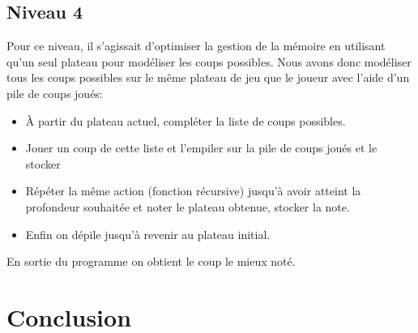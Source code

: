 \documentclass[a4paper, 11pt]{article}
\begin{document}
\subsection{Niveau 4}
Pour ce niveau, il s'agissait d'optimiser la gestion de la mémoire en utilisant qu'un seul plateau pour modéliser les coups possibles. Nous avons donc modéliser tous les coups possibles sur le même plateau de jeu que le joueur avec l'aide d'un pile de coups joués:
\begin{itemize}
\item À partir du plateau actuel, compléter la liste de coups possibles.
\item Jouer un coup de cette liste et l'empiler sur la pile de coups joués et le stocker
\item Répéter la même action (fonction récursive) jusqu'à avoir atteint la profondeur souhaitée et noter le plateau obtenue, stocker la note.
\item Enfin on dépile jusqu'à revenir au plateau initial.
\end{itemize}
En sortie du programme on obtient le coup le mieux noté.
\section{Conclusion}
\end{document}
